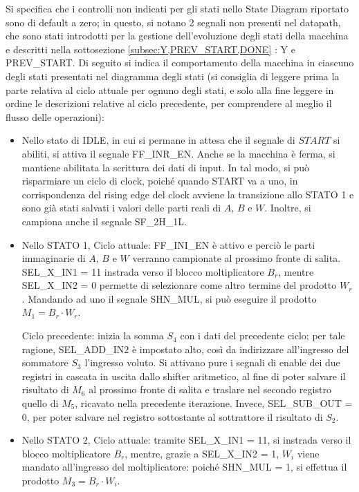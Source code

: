 \noindent Si specifica che i controlli non indicati per gli stati nello State Diagram riportato sono di default a zero; in questo, si notano 2 segnali non presenti nel datapath, che sono stati introdotti per la gestione dell'evoluzione degli stati della macchina e descritti nella sottosezione \ref{subsec:Y,PREV_START,DONE} : Y e PREV\_START. Di seguito si indica il comportamento della macchina in ciascuno degli stati presentati nel diagramma degli stati (si consiglia di leggere prima la parte relativa al ciclo attuale per ognuno degli stati, e solo alla fine leggere in ordine le descrizioni relative al ciclo precedente, per comprendere al meglio il flusso delle operazioni):
\begin{itemize}
\item Nello stato di IDLE, in cui si permane in attesa che il segnale di $START$ si abiliti, si attiva il segnale FF\_INR\_EN. Anche se la macchina è ferma, si mantiene abilitata la scrittura dei dati di input. In tal modo, si può risparmiare un ciclo di clock, poiché quando START va a uno, in corrispondenza del rising edge del clock avviene la transizione allo STATO 1 e sono già stati salvati i valori delle parti reali di $A$, $B$ e $W$. Inoltre, si campiona anche il segnale SF\_2H\_1L.

\item  Nello STATO 1, Ciclo attuale: FF\_INI\_EN è attivo e perciò le parti immaginarie di $A$, $B$ e $W$ verranno campionate al prossimo fronte di salita. SEL\_X\_IN1 =  11 instrada verso il blocco moltiplicatore $B_{r}$, mentre SEL\_X\_IN2 = 0 permette di selezionare come altro termine del prodotto $W_{r}$. Mandando ad uno il segnale SHN\_MUL, si può eseguire il prodotto $M_1 =B_{r} \cdot W_{r}$. 

\noindent Ciclo precedente: inizia la somma $S_4$ con i dati del precedente ciclo; per tale ragione, SEL\_ADD\_IN2 è impostato alto, così da indirizzare all'ingresso del sommatore $S_3$ l'ingresso voluto. Si attivano pure i segnali di enable dei due registri in cascata in uscita dallo shifter aritmetico, al fine di poter salvare il risultato di $M_6$ al prossimo fronte di salita e traslare nel secondo registro quello di $M_5$, ricavato nella precedente iterazione. Invece, SEL\_SUB\_OUT = 0, per poter salvare nel registro sottostante al sottrattore il risultato di $S_2$.

\item Nello STATO 2, Ciclo attuale:  tramite SEL\_X\_IN1 =  11, si instrada verso il blocco moltiplicatore $B_{r}$, mentre, grazie a SEL\_X\_IN2 =  1,  $W_{i}$ viene mandato all'ingresso del moltiplicatore: poiché  SHN\_MUL = 1, si effettua il prodotto $M_3 =B_{r} \cdot W_{i}$. 


\end{itemize}
